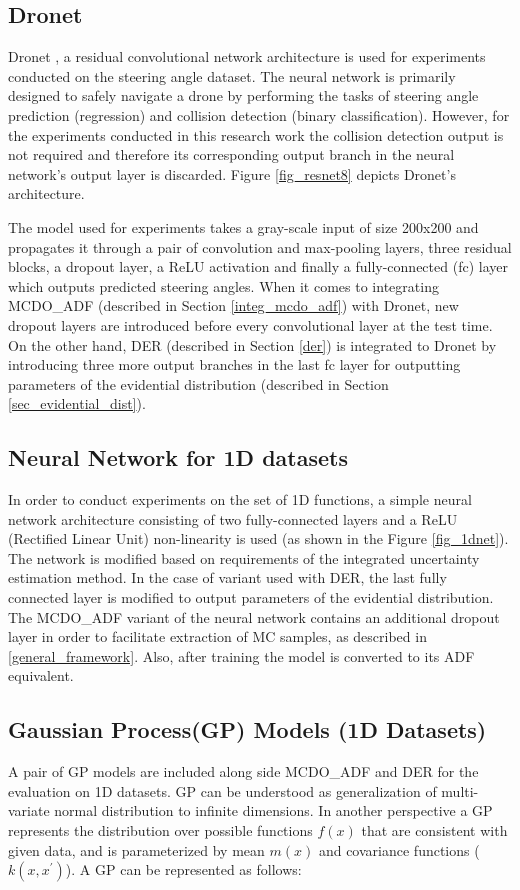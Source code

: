 \subsection{Dronet}
Dronet \cite{loquercio2018dronet}, a residual convolutional network architecture is used for experiments conducted on the steering angle dataset. The neural network is primarily designed to safely navigate a drone by performing the tasks of steering angle prediction (regression) and collision detection (binary classification). However, for the experiments conducted in this research work the collision detection output is not required and therefore its corresponding output branch in the neural network's output layer is discarded. Figure \ref{fig_resnet8} depicts Dronet's architecture.

The model used for experiments takes a gray-scale input of size 200x200 and propagates it through a pair of convolution and max-pooling layers, three residual blocks, a dropout layer, a ReLU activation and finally a fully-connected (fc) layer which outputs predicted steering angles. When it comes to integrating MCDO\_ADF (described in Section \ref{integ_mcdo_adf}) with Dronet, new dropout layers are introduced before every convolutional layer at the test time. On the other hand, DER (described in Section \ref{der}) is integrated to Dronet by introducing three more output branches in the last fc layer for outputting parameters of the evidential distribution (described in Section \ref{sec_evidential_dist}).

\subsection{Neural Network for 1D datasets}\label{1D_net}

In order to conduct experiments on the set of 1D functions, a simple neural network architecture consisting of two fully-connected layers and a ReLU (Rectified Linear Unit) non-linearity is used (as shown in the Figure \ref{fig_1dnet}). The network is modified based on requirements of the integrated uncertainty estimation method. In the case of variant used with DER, the last fully connected layer is modified to output parameters of the evidential distribution. The MCDO\_ADF variant of the neural network contains an additional dropout layer in order to facilitate extraction of MC samples, as described in \ref{general_framework}. Also, after training the model is converted to its ADF equivalent.

\subsection{Gaussian Process(GP) Models (1D Datasets)}
A pair of GP models are included along side MCDO\_ADF and DER for the evaluation on 1D datasets. GP can be understood as generalization of multi-variate normal distribution to infinite dimensions. In another perspective a GP represents the distribution over possible functions $f(x)$ that are consistent with given data, and is parameterized by mean $m(x)$ and covariance functions ($k(x, x^\prime)$). A GP can be represented as follows:

